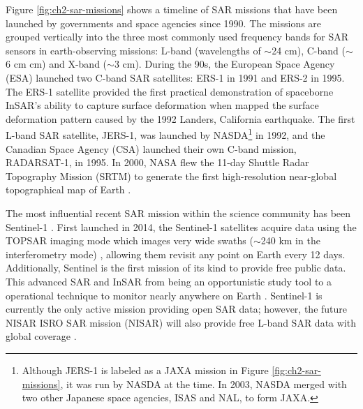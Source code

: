 Figure \ref{fig:ch2-sar-missions} shows a timeline of SAR missions that have been launched by governments and space agencies since 1990. The missions are grouped vertically into the three most commonly used frequency bands for SAR sensors in earth-observing missions: L-band (wavelengths of $\sim$24 cm), C-band ($\sim$6 cm cm) and X-band ($\sim$3 cm).
During the 90s, the European Space Agency (ESA) launched two C-band SAR satellites: ERS-1 in 1991 and ERS-2 in 1995. The ERS-1 satellite provided the first practical demonstration of spaceborne InSAR's ability to capture surface deformation
when \cite{Massonnet1993DisplacementFieldLanders} mapped the surface deformation pattern caused by the 1992 Landers, California earthquake. The first L-band SAR satellite, JERS-1, was launched by NASDA\footnote{Although JERS-1 is labeled as a JAXA mission in Figure \ref{fig:ch2-sar-missions}, it was run by NASDA at the time. In 2003, NASDA merged with two other Japanese space agencies, ISAS and NAL, to form JAXA.} in 1992, and the Canadian Space Agency (CSA) launched their own C-band mission, RADARSAT-1, in 1995. In 2000, NASA flew the 11-day Shuttle Radar Topography Mission (SRTM) to generate the first high-resolution near-global topographical map of Earth \citep{Farr2007ShuttleRadarTopography}.

The most influential recent SAR mission within the science community has been Sentinel-1 \citep{Torres2012GmesSentinel1}. First launched in 2014, the Sentinel-1 satellites acquire data using the TOPSAR imaging mode which images very wide swaths ($\sim$240 km in the interferometry mode) \cite{Zan2006TopsarTerrainObservation}, allowing them revisit any point on Earth every 12 days.  Additionally, Sentinel is the first mission of its kind to provide free public data. This advanced SAR and InSAR from being an opportunistic study tool to  a operational technique to monitor nearly anywhere on Earth  \cite{Rosen2021ShiftingGround}. Sentinel-1 is currently the only active mission providing open SAR data; however, the future NISAR ISRO SAR mission (NISAR) will also provide free L-band SAR data with global coverage \citep{Rosen2015NasaIsroSar}.


